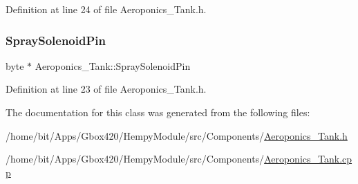 Definition at line 24 of file Aeroponics\+\_\+\+Tank.\+h.

\mbox{\label{class_aeroponics___tank_ac4756204f5ddb062dcb726cf791baa09}} 
\subsubsection{\texorpdfstring{Spray\+Solenoid\+Pin}{SpraySolenoidPin}}
{\footnotesize\ttfamily byte $\ast$ Aeroponics\+\_\+\+Tank\+::\+Spray\+Solenoid\+Pin\hspace{0.3cm}{\ttfamily [protected]}}



Definition at line 23 of file Aeroponics\+\_\+\+Tank.\+h.



The documentation for this class was generated from the following files\+:\begin{DoxyCompactItemize}
\item 
/home/bit/\+Apps/\+Gbox420/\+Hempy\+Module/src/\+Components/\hyperlink{_hempy_module_2src_2_components_2_aeroponics___tank_8h}{Aeroponics\+\_\+\+Tank.\+h}\item 
/home/bit/\+Apps/\+Gbox420/\+Hempy\+Module/src/\+Components/\hyperlink{_hempy_module_2src_2_components_2_aeroponics___tank_8cpp}{Aeroponics\+\_\+\+Tank.\+cpp}\end{DoxyCompactItemize}
